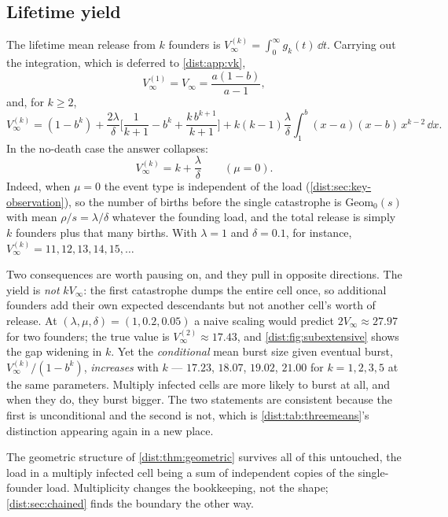 \subsection{Lifetime yield}
\label{dist:sec:moi-yield}

The lifetime mean release from $k$ founders is
$V_\infty^{(k)}=\int_0^\infty g_k(t)\,\dd t$. Carrying out the integration,
which is deferred to \cref{dist:app:vk},
\begin{equation}
V_\infty^{(1)}=V_\infty=\frac{a(1-b)}{a-1},
\label{dist:eq:vk1}
\end{equation}
and, for $k\ge2$,
\begin{equation}
V_\infty^{(k)}
=(1-b^k)
+\frac{2\lambda}{\delta}\Biggl[\frac{1}{k+1}-b^k+\frac{k\,b^{k+1}}{k+1}\Biggr]
+k(k-1)\frac{\lambda}{\delta}\int_1^b (x-a)(x-b)\,x^{k-2}\,\dd x.
\label{dist:eq:vk}
\end{equation}
In the no-death case the answer collapses:
\begin{equation}
V_\infty^{(k)}=k+\frac{\lambda}{\delta}\qquad(\mu=0).
\label{dist:eq:vkmuzero}
\end{equation}
Indeed, when $\mu=0$ the event type is independent of the load
(\cref{dist:sec:key-observation}), so the number of births before the single
catastrophe is $\mathrm{Geom}_0(s)$ with mean $\rho/s=\lambda/\delta$
whatever the founding load, and the total release is simply $k$ founders plus
that many births. With $\lambda=1$ and $\delta=0.1$, for instance,
$V_\infty^{(k)}=11,12,13,14,15,\ldots$

Two consequences are worth pausing on, and they pull in opposite directions.
The yield is \emph{not} $kV_\infty$: the first catastrophe dumps the entire
cell once, so additional founders add their own expected descendants but not
another cell's worth of release. At $(\lambda,\mu,\delta)=(1,0.2,0.05)$ a
naive scaling would predict $2V_\infty\approx27.97$ for two founders; the
true value is $V_\infty^{(2)}\approx17.43$, and
\cref{dist:fig:subextensive} shows the gap widening in $k$. Yet the
\emph{conditional} mean burst size given eventual burst,
$V_\infty^{(k)}/(1-b^k)$, \emph{increases} with $k$ --- $17.23$, $18.07$,
$19.02$, $21.00$ for $k=1,2,3,5$ at the same parameters. Multiply infected
cells are more likely to burst at all, and when they do, they burst bigger.
The two statements are consistent because the first is unconditional and the
second is not, which is \cref{dist:tab:threemeans}'s distinction appearing
again in a new place.

The geometric structure of \cref{dist:thm:geometric} survives all of this
untouched, the load in a multiply infected cell being a sum of independent
copies of the single-founder load. Multiplicity changes the bookkeeping, not
the shape; \cref{dist:sec:chained} finds the boundary the other way.

